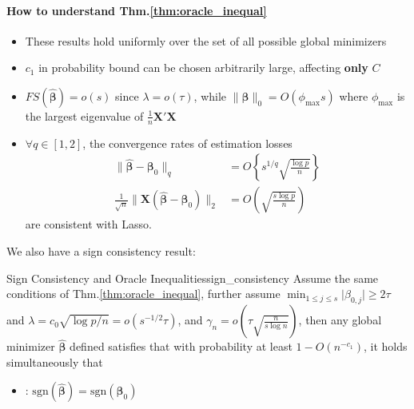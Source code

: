 \documentclass[twoside]{article}
\begin{document}
\paragraph*{How to understand Thm.\ref{thm:oracle_inequal}} 
\begin{itemize}
    \item These results hold uniformly over the set of all possible global minimizers
    \item $c_1$ in probability bound can be chosen arbitrarily large, affecting \textbf{only} $C$
    \item $FS\left(\hat{\boldsymbol{\beta}}\right) = o(s)$ since $\lambda = o(\tau)$, while $\lVert\hat{\boldsymbol{\beta}}\rVert _0 = O(\phi_{\max}s)$ where $\phi_{\max}$ is the largest eigenvalue of $\frac{1}{n}\mathbf{X}'\mathbf{X}$
    \item $\forall q \in[1,2]$, the convergence rates of estimation losses
    \begin{align*}
        \lVert \hat{\boldsymbol{\beta}} - \boldsymbol{\beta}_0\rVert _q &= O\left\{ s^{1/q} \sqrt{\frac{\log p}{n}} \right\} \\
        \frac{1}{\sqrt{n}} \lVert \mathbf{X}\left(\hat{\boldsymbol{\beta}} - \boldsymbol{\beta}_0\right)\rVert _2 &= O\left( \sqrt{\frac{s \log p}{n}} \right)
    \end{align*}
    are consistent with Lasso.
\end{itemize}
We also have a sign consistency result:
\begin{theorem}{Sign Consistency and Oracle Inequalities}{sign_consistency}
    Assume the same conditions of Thm.\ref{thm:oracle_inequal}, further assume $\min_{1\leq j \leq s}\lvert \beta_{0,j} \rvert \geq 2\tau $ and $\lambda = c_0\sqrt{\log p/n} = o(s^{-1/2}\tau)$, and $\gamma_n = o\left(\tau \sqrt{\frac{n}{s\log n}}\right)$, then any global minimizer $\hat{\boldsymbol{\beta}}$ defined satisfies that with probability at least $1-O(n^{-c_1})$, it holds simultaneously that 
    \begin{itemize}
        \item {}: $\mathrm{sgn}\left( \hat{\boldsymbol{\beta}} \right)=\mathrm{sgn}\left( \boldsymbol{\beta}_0 \right)$
    \end{itemize}
\end{theorem}

\newpage


\end{document}
